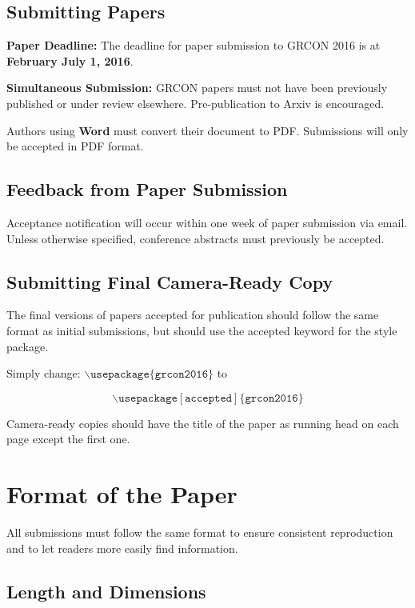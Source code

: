 \documentclass{article}
\begin{document}
\subsection{Submitting Papers}

{\bf Paper Deadline:} The deadline for paper submission to GRCON 2016
is at \textbf{February July 1, 2016}.

{\bf Simultaneous Submission:} GRCON papers must not have been previously 
published or under review elsewhere.  Pre-publication to Arxiv is encouraged.

\medskip

Authors using \textbf{Word} must convert their document to PDF.  
Submissions will only be accepted in PDF format.

\subsection{Feedback from Paper Submission}

Acceptance notification will occur within one week of paper submission via email.
Unless otherwise specified, conference abstracts must previously be accepted.

\subsection{Submitting Final Camera-Ready Copy}

The final versions of papers accepted for publication should follow the
same format as initial submissions, but should use the accepted keyword 
for the style package.

Simply change:
$\mathtt{\backslash usepackage\{grcon2016\}}$ to 

$$\mathtt{\backslash usepackage[accepted]\{grcon2016\}}$$

\noindent

Camera-ready copies should have the title of the paper as running head
on each page except the first one.  

\section{Format of the Paper} 
 
All submissions must follow the same format to ensure consistent reproduction
and to let readers more easily find information.

\subsection{Length and Dimensions}
\end{document}
